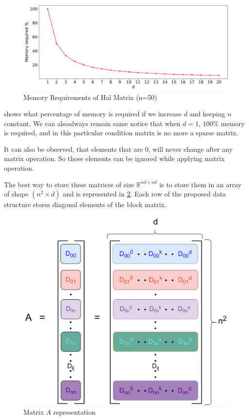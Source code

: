 \documentclass[11pt,twocolumn]{article}
\begin{document}
    \begin{figure}[H]
        \includegraphics[width=\linewidth]{graphs/memory2.png}
        \caption{Memory Requirements of Hal Matrix (n=50)}
        \label{img:memory}    
    \end{figure}

     shows what percentage of memory is required if we increase $d$ and keeping $n$ constant. We can alsoalways remain same notice that when $d=1$, $100\%$ memory is required, and in this particular condition matrix is no more a sparse matrix.

    It can also be observed, that elements that are $0$, will never change after any matrix operation. So those elements can be ignored while applying matrix operation.

    The best way to store these matrices of size $\mathbb{R}^{nd \times nd}$ is to store them in an array of shape $(n^2 \times d)$ and is represented in \cref{img:representation}. Each row of the proposed data structure stores diagonal elements of the block matrix.
    
    \begin{figure}[htbp]
        \centering
        \includegraphics[width=0.8\linewidth]{images/representation.png}
        \caption{Matrix $A$ representation}
        \label{img:representation}    
    \end{figure}
\end{document}
